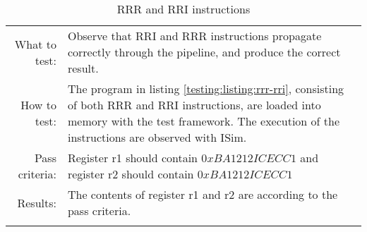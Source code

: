 \begin{table}[H]
  \begin{tabular}{r | p{8cm}}
    \noalign{\smallskip}\hline\noalign{\smallskip}
    
    What to test:  & Observe that RRI and RRR instructions propagate correctly through the pipeline, 
                     and produce the correct result.\\

    \noalign{\smallskip}\hline\noalign{\smallskip}

    How to test:  & The program in listing \ref{testing:listing:rrr-rri}, consisting of both RRR and RRI instructions,
                    are loaded into memory with the test framework. The execution of the instructions are observed with
                    ISim.\\

    \noalign{\smallskip}\hline\noalign{\smallskip}

    Pass criteria: &  Register r1 should contain $0xBA1212ICECC1$
    and register r2 should contain $0xBA1212ICECC1$ \\
    
     \noalign{\smallskip}\hline\noalign{\smallskip}

    Results: & The contents of register r1 and r2 are according to the pass criteria. \\
   \noalign{\smallskip}\hline\noalign{\smallskip}
  
  
  \end{tabular}
  \caption{RRR and RRI instructions}
  \label{testing:fitness:pipeline_test}
\end{table}

